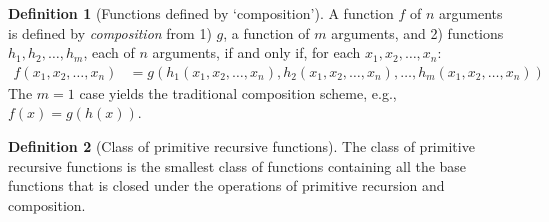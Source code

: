 \documentclass[11pt]{book}
\theoremstyle{definition}
\newtheorem{definition}{Definition}
\theoremstyle{plain}
\theoremstyle{problemstyle}
\theoremstyle{remark}
\theoremstyle{definition}
\begin{document}
\begin{definition}[Functions defined by `composition']
    \label{def:composition}
    A function $f$ of $n$ arguments is defined by \emph{composition} from 1) $g$, a function of $m$ arguments, and 2) functions $h_1,h_2,\dots,h_m$, each of $n$ arguments, if and only if, for each $x_1,x_2,\dots,x_n$:
    \begin{equation}
        \label{eq:composition}
        \begin{aligned}
            f(x_1,x_2,\dots,x_n)&=g(h_1(x_1,x_2,\dots,x_n),h_2(x_1,x_2,\dots,x_n),\dots,h_m(x_1,x_2,\dots,x_n))
        \end{aligned}
    \end{equation}
    The $m=1$ case yields the traditional composition scheme, e.g., $f(x)=g(h(x))$.
\end{definition}
\begin{definition}[Class of primitive recursive functions]
    The class of primitive recursive functions is the smallest class of functions containing all the base functions that is closed under the operations of primitive recursion and composition.
\end{definition}
\end{document}
